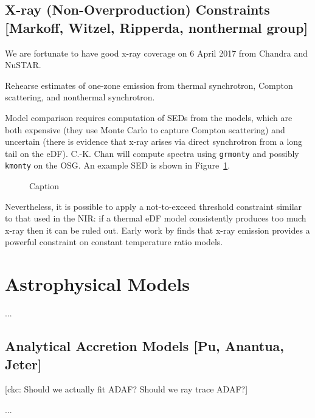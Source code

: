 \documentclass[twocolumn,tighten,dvipsnames]{aastex63}
\newcommand\ckc[1]{{\color{MidnightBlue}[ckc: #1]}}
\begin{document}
\subsection{X-ray (Non-Overproduction) Constraints
  [Markoff, Witzel, Ripperda, nonthermal group]}
\label{sec:xrayconst}

We are fortunate to have good x-ray coverage on 6 April 2017 from Chandra and NuSTAR.

Rehearse estimates of one-zone emission from thermal synchrotron, Compton scattering, and nonthermal synchrotron.

Model comparison requires computation of SEDs from the models, which are both expensive (they use Monte Carlo to capture Compton scattering) and uncertain (there is evidence that x-ray arises via direct synchrotron from a long tail on the eDF).  C.-K. Chan will compute spectra using {\tt grmonty} and possibly {\tt kmonty} on the OSG.  An example SED is shown in Figure~\ref{fig:SEDexamp}.

\begin{figure}
  \caption{Caption}
  \label{fig:SEDexamp}
\end{figure}

Nevertheless, it is possible to apply a not-to-exceed threshold constraint similar to that used in the NIR: if a thermal eDF model consistently produces too much x-ray then it can be ruled out.  Early work by \citet{2009ApJ...706..497M} finds that x-ray emission provides a powerful constraint on constant temperature ratio models.

\section{Astrophysical Models}

...

\subsection{Analytical Accretion Models
  [Pu, Anantua, Jeter]}
\label{sec:anamodels}

\ckc{Should we actually fit ADAF?
  Should we ray trace ADAF?}

...
\end{document}
